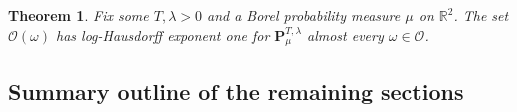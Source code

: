 \documentclass[10pt]{article}
\numberwithin{equation}{section}
\newtheorem{theorem}{Theorem}[section]
\theoremstyle{definition}
\newcommand{\R}{{\mathbb R}}
\begin{document}
 
\begin{theorem}\label{ThmHAUSDORF} Fix  some $T,\lambda>0$ and a Borel probability measure $\mu$ on $\R^2$.  The set $\mathscr{O}(\omega)$ has log-Hausdorff exponent one for  $\mathbf{P}_{\mu}^{T,\lambda }$ almost every  $\omega\in \mathcal{O}$.  
\end{theorem}






\subsection{Summary outline of the remaining  sections}\label{SubsectionOutline}
\end{document}

